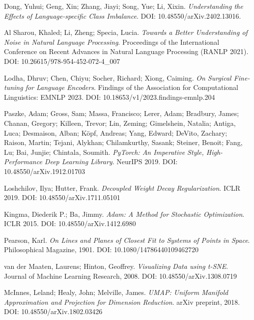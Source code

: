 \documentclass[12pt]{article}
\begin{document}
\begin{thebibliography}{9}
Dong, Yuhui; Geng, Xin; Zhang, Jiayi; Song, Yue; Li, Xixin.
\textit{Understanding the Effects of Language-specific Class Imbalance}.
DOI: 10.48550/arXiv.2402.13016.

Al Sharou, Khaled; Li, Zheng; Specia, Lucia.
\textit{Towards a Better Understanding of Noise in Natural Language Processing}.
Proceedings of the International Conference on Recent Advances in Natural Language Processing (RANLP 2021).
DOI: 10.26615/978-954-452-072-4\_007

Lodha, Dhruv; Chen, Chiyu; Socher, Richard; Xiong, Caiming.
\textit{On Surgical Fine-tuning for Language Encoders}.
Findings of the Association for Computational Linguistics: EMNLP 2023.
DOI: 10.18653/v1/2023.findings-emnlp.204

Paszke, Adam; Gross, Sam; Massa, Francisco; Lerer, Adam; Bradbury, James; Chanan, Gregory; Killeen, Trevor; Lin, Zeming; Gimelshein, Natalia; Antiga, Luca; Desmaison, Alban; Köpf, Andreas; Yang, Edward; DeVito, Zachary; Raison, Martin; Tejani, Alykhan; Chilamkurthy, Sasank; Steiner, Benoit; Fang, Lu; Bai, Junjie; Chintala, Soumith.
\textit{PyTorch: An Imperative Style, High-Performance Deep Learning Library}.
NeurIPS 2019.
DOI: 10.48550/arXiv.1912.01703

Loshchilov, Ilya; Hutter, Frank.
\textit{Decoupled Weight Decay Regularization}.
ICLR 2019.
DOI: 10.48550/arXiv.1711.05101

Kingma, Diederik P.; Ba, Jimmy.
\textit{Adam: A Method for Stochastic Optimization}.
ICLR 2015.
DOI: 10.48550/arXiv.1412.6980

Pearson, Karl.
\textit{On Lines and Planes of Closest Fit to Systems of Points in Space}.
Philosophical Magazine, 1901.
DOI: 10.1080/14786440109462720

van der Maaten, Laurens; Hinton, Geoffrey.
\textit{Visualizing Data using t-SNE}.
Journal of Machine Learning Research, 2008.
DOI: 10.48550/arXiv.1308.0719

McInnes, Leland; Healy, John; Melville, James.
\textit{UMAP: Uniform Manifold Approximation and Projection for Dimension Reduction}.
arXiv preprint, 2018.
DOI: 10.48550/arXiv.1802.03426


\end{thebibliography}
\end{document}
